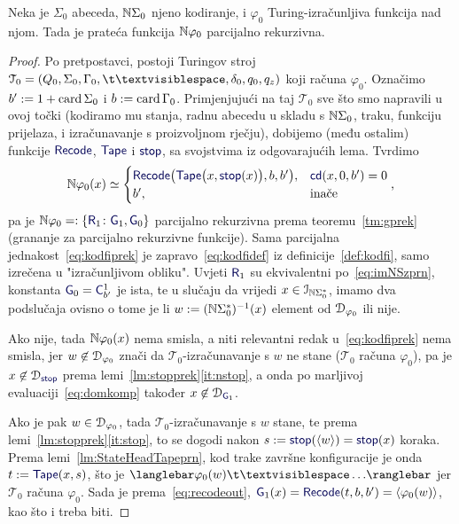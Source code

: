 \begin{teorem}\label{tm:tikp}
Neka je $\Sigma_0$ abeceda, ${\mathbb N}\Sigma_0$ njeno kodiranje, i $\varphi_0$ Turing-izračunljiva funkcija nad njom. Tada je prateća funkcija ${\mathbb N}\varphi_0$ parcijalno rekurzivna.
\end{teorem}
\begin{proof}
Po pretpostavci, postoji Turingov stroj $\mathcal T_0=(Q_0,\Sigma_0,\Gamma_0,\bl,\delta_0,q_0,q_z)$ koji računa $\varphi_0$. Označimo $b':=1+\operatorname{card}\Sigma_0$ i $b:=\operatorname{card}\Gamma_0$. Primjenjujući na taj $\mathcal T_0$ sve što smo napravili u ovoj točki (kodiramo mu stanja, radnu abecedu u skladu s ${\mathbb N}\Sigma_0$, traku, funkciju prijelaza, i izračunavanje s proizvoljnom rječju), dobijemo (među ostalim) funkcije $\f{Recode}$, $\f{Tape}$ i $\f{stop}$, sa svojstvima iz odgovarajućih lema. Tvrdimo%
\begin{equation}\label{eq:kodfiprek}
    \N\varphi_0(x)\simeq\begin{cases}
    \f{Recode}\bigl(\f{Tape}\bigl(x,\f{stop}(x)\bigr),b,b'\bigr),&\f{cd}(x,0,b')=0\\
    b',&\text{inače}
    \end{cases}\text,
\end{equation}
pa je $\N\varphi_0=:\{\f R_1\colon\f G_1,\f G_0\}$ parcijalno rekurzivna prema teoremu~\ref{tm:gprek} (grananje za parcijalno rekurzivne funkcije). Sama parcijalna jednakost~\eqref{eq:kodfiprek} je zapravo~\eqref{eq:kodfidef} iz definicije~\ref{def:kodfi}, samo izrečena u "izračunljivom obliku". Uvjeti $\f R_1$ su ekvivalentni po~\eqref{eq:imNSzprn}, konstanta $\f G_0=\f C_{b'}^1$ je ista, te u slučaju da vrijedi $x\in\mathcal I_{{\mathbb N}\Sigma_0^*}$, imamo dva podslučaja ovisno o tome je li $w:=({\mathbb N}\Sigma_0^*)^{-1}(x)$ element od $\mathcal D_{\varphi_0}$ ili nije.

Ako nije, tada ${\mathbb N}\varphi_0(x)$ nema smisla, a niti relevantni redak u~\eqref{eq:kodfiprek} nema smisla, jer $w\not\in\mathcal D_{\varphi_0}$ znači da $\mathcal T_0$-izračunavanje s $w$ ne stane ($\mathcal T_0$ računa $\varphi_0$), pa je $x\not\in\dom{\f{stop}}$ prema lemi~\ref{lm:stopprek}\eqref{it:nstop}, a onda po marljivoj evaluaciji~\eqref{eq:domkomp} također $x\not\in\dom{\f G_1}$.

Ako je pak $w\in\mathcal D_{\varphi_0}$, tada $\mathcal T_0$-izračunavanje s $w$ stane, te prema lemi~\ref{lm:stopprek}\eqref{it:stop}, to se dogodi nakon $s:=\f{stop}(\kr w)=\f{stop}(x)$ koraka. Prema lemi~\ref{lm:StateHeadTapeprn}, kod trake završne konfiguracije je onda $t:=\f{Tape}(x,s)$, što je $\knk{\varphi_0(w)\bl\ldots}$ jer $\mathcal T_0$ računa $\varphi_0$. Sada je prema~\eqref{eq:recodeout}, $\f G_1(x)=\f{Recode}(t,b,b')=\kr{\varphi_0(w)}$, kao što i treba biti.
\end{proof}

